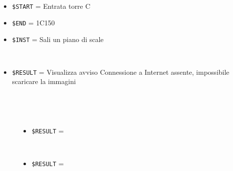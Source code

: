 \documentclass[../../SperimentazioniPratiche.tex]{subfiles}
\begin{document}
	
	\newpage	
			\paragraph*{}
			\label{Prova14A.1}	
			\begin{tcolorbox}[fonttitle=\bfseries, 
								adjusted title={\Large Prova 14A.1}, 
								breakable, 
								sharp corners=south,
								colback=white, 
								colframe=white!60!black]
								
				\begin{description}[leftmargin=0.7cm,labelwidth=!]
				
					\item[Input] \ \par 
        				\begin{itemize}
        					\item \verb|$START| = Entrata torre C
        					\item \verb|$END| = 1C150
							\item \verb|$INST| = Sali un piano di scale
        				\end{itemize}
        				
        			\tcbline 
        				
        			\item[Output atteso] \ \par
        				\begin{itemize}
        					\item \verb|$RESULT| = Visualizza avviso Connessione a Internet assente, impossibile scaricare la immagini
        				\end{itemize}

					\tcbline        				
        				
        			\item[Output riscontrato] \ \par
        				\begin{description}
        				
        					\item[\dispositivoA] \ \par
        					\begin{itemize}
        						\item \verb|$RESULT| = \ns
        					\end{itemize}      					
        					
        					\item[\dispositivoB] \ \par
        					\begin{itemize}
        						\item \verb|$RESULT| = \ns
        					\end{itemize}
        					

\end{description}
\end{description}
\end{tcolorbox}
\end{document}
